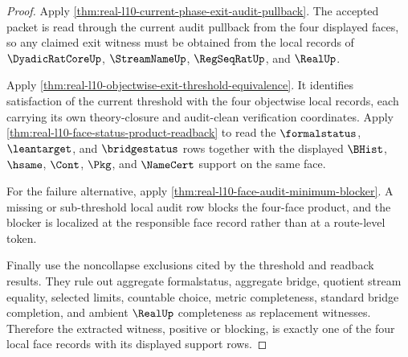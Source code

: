 \begin{proof}
Apply \autoref{thm:real-l10-current-phase-exit-audit-pullback}. The accepted
packet is read through the current audit pullback from the four displayed
faces, so any claimed exit witness must be obtained from the local records of
$\DyadicRatCoreUp$, $\StreamNameUp$, $\RegSeqRatUp$, and $\RealUp$.

Apply \autoref{thm:real-l10-objectwise-exit-threshold-equivalence}. It
identifies satisfaction of the current threshold with the four objectwise
local records, each carrying its own theory-closure and audit-clean
verification coordinates. Apply
\autoref{thm:real-l10-face-status-product-readback} to read the
$\formalstatus$, $\leantarget$, and $\bridgestatus$ rows together with the
displayed $\BHist$, $\hsame$, $\Cont$, $\Pkg$, and $\NameCert$ support on the
same face.

For the failure alternative, apply
\autoref{thm:real-l10-face-audit-minimum-blocker}. A missing or sub-threshold
local audit row blocks the four-face product, and the blocker is localized at
the responsible face record rather than at a route-level token.

Finally use the noncollapse exclusions cited by the threshold and readback
results. They rule out aggregate formalstatus, aggregate bridge, quotient
stream equality, selected limits, countable choice, metric completeness,
standard bridge completion, and ambient $\RealUp$ completeness as replacement
witnesses. Therefore the extracted witness, positive or blocking, is exactly
one of the four local face records with its displayed support rows.
\end{proof}

